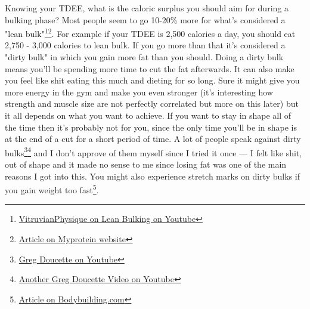 \documentclass[openany, 12pt]{book}
\begin{document}
	Knowing your TDEE, what is the caloric surplus you should aim for during a bulking phase? Most people seem to go 10-20\% more for what's considered a "lean bulk"\footnote{\href{https://www.youtube.com/watch?v=rCdba0UPTMk}{VitruvianPhysique on Lean Bulking on Youtube}}\footnote{\href{https://us.myprotein.com/thezone/nutrition/the-lean-bulk-how-to-minimize-fat-gain-while-bulking/}{Article on Myprotein website}}. For example if your TDEE is 2,500 calories a day, you should eat 2,750 - 3,000 calories to lean bulk. If you go more than that it's considered a "dirty bulk" in which you gain more fat than you should. Doing a dirty bulk means you'll be spending more time to cut the fat afterwards. It can also make you feel like shit eating this much and dieting for so long. Sure it might give you more energy in the gym and make you even stronger (it's interesting how strength and muscle size are not perfectly correlated but more on this later) but it all depends on what you want to achieve. If you want to stay in shape all of the time then it's probably not for you, since the only time you'll be in shape is at the end of a cut for a short period of time. A lot of people speak against dirty bulks\footnote{\href{https://www.youtube.com/watch?v=DjEnkzhz5T4}{Greg Doucette on Youtube}}\footnote{\href{https://www.youtube.com/watch?v=DjEnkzhz5T4}{Another Greg Doucette Video on Youtube}} and I don't approve of them myself since I tried it once --- I felt like shit, out of shape and it made no sense to me since losing fat was one of the main reasons I got into this. You might also experience stretch marks on dirty bulks if you gain weight too fast\footnote{\href{https://www.bodybuilding.com/content/stretchmark-maintenance.html}{Article on Bodybuilding.com}}.
	
	
	
	
\end{document}
